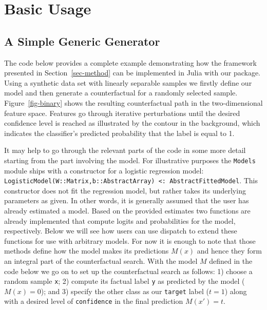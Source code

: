 \documentclass{juliacon}
\begin{document}
\hypertarget{sec-start}{%
\section{Basic Usage}\label{sec-start}}

\hypertarget{a-simple-generic-generator}{%
\subsection{A Simple Generic
Generator}\label{a-simple-generic-generator}}

The code below provides a complete example demonstrating how the
framework presented in Section~\ref{sec-method} can be implemented in
Julia with our package. Using a synthetic data set with linearly
separable samples we firstly define our model and then generate a
counterfactual for a randomly selected sample. Figure~\ref{fig-binary}
shows the resulting counterfactual path in the two-dimensional feature
space. Features go through iterative perturbations until the desired
confidence level is reached as illustrated by the contour in the
background, which indicates the classifier's predicted probability that
the label is equal to 1.

It may help to go through the relevant parts of the code in some more
detail starting from the part involving the model. For illustrative
purposes the \texttt{Models} module ships with a constructor for a
logistic regression model:
\texttt{LogisticModel(W::Matrix,b::AbstractArray)\ \textless{}:\ AbstractFittedModel}.
This constructor does not fit the regression model, but rather takes its
underlying parameters as given. In other words, it is generally assumed
that the user has already estimated a model. Based on the provided
estimates two functions are already implemented that compute logits and
probabilities for the model, respectively. Below we will see how users
can use dispatch to extend these functions for use with arbitrary
models. For now it is enough to note that those methods define how the
model makes its predictions \(M(x)\) and hence they form an integral
part of the counterfactual search. With the model \(M\) defined in the
code below we go on to set up the counterfactual search as follows: 1)
choose a random sample \texttt{x}; 2) compute its factual label
\texttt{y} as predicted by the model (\(M(x)=0\)); and 3) specify the
other class as our \texttt{target} label (\(t=1\)) along with a desired
level of \texttt{confidence} in the final prediction \(M(x\prime)=t\).
\end{document}
